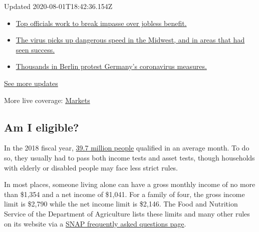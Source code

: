 Updated 2020-08-01T18:42:36.154Z

\begin{itemize}
\tightlist
\item
  \href{https://www.nytimes.com/2020/08/01/world/coronavirus-covid-19.html?action=click\&pgtype=Article\&state=default\&region=MAIN_CONTENT_1\&context=storylines_live_updates\#link-3ac56579}{Top
  officials work to break impasse over jobless benefit.}
\item
  \href{https://www.nytimes.com/2020/08/01/world/coronavirus-covid-19.html?action=click\&pgtype=Article\&state=default\&region=MAIN_CONTENT_1\&context=storylines_live_updates\#link-8796723}{The
  virus picks up dangerous speed in the Midwest, and in areas that had
  seen success.}
\item
  \href{https://www.nytimes.com/2020/08/01/world/coronavirus-covid-19.html?action=click\&pgtype=Article\&state=default\&region=MAIN_CONTENT_1\&context=storylines_live_updates\#link-25930521}{Thousands
  in Berlin protest Germany's coronavirus measures.}
\end{itemize}

\href{https://www.nytimes.com/2020/08/01/world/coronavirus-covid-19.html?action=click\&pgtype=Article\&state=default\&region=MAIN_CONTENT_1\&context=storylines_live_updates}{See
more updates}

More live coverage:
\href{https://www.nytimes.com/live/2020/07/31/business/stock-market-today-coronavirus?action=click\&pgtype=Article\&state=default\&region=MAIN_CONTENT_1\&context=storylines_live_updates}{Markets}

\hypertarget{am-i-eligible}{%
\subsection{Am I eligible?}\label{am-i-eligible}}

In the 2018 fiscal year,
\href{https://fns-prod.azureedge.net/sites/default/files/resource-files/Characteristics2018-Summary.pdf}{39.7
million people} qualified in an average month. To do so, they usually
had to pass both income tests and asset tests, though households with
elderly or disabled people may face less strict rules.

In most places, someone living alone can have a gross monthly income of
no more than \$1,354 and a net income of \$1,041. For a family of four,
the gross income limit is \$2,790 while the net income limit is \$2,146.
The Food and Nutrition Service of the Department of Agriculture lists
these limits and many other rules on its website via a
\href{https://www.fns.usda.gov/snap/recipient/eligibility}{SNAP
frequently asked questions page}.

